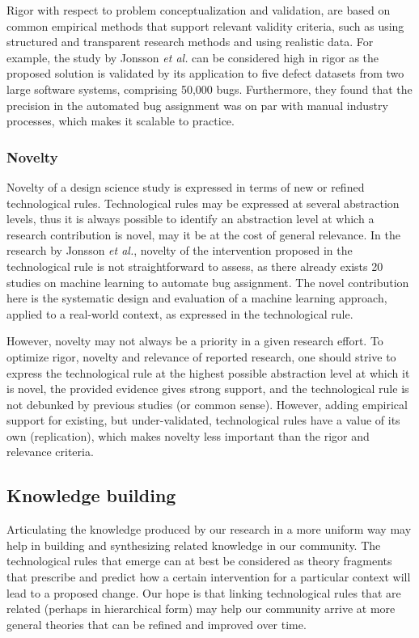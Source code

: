 \documentclass[graybox]{svmult}
\begin{document}
Rigor with respect to problem conceptualization and validation, are based on common empirical methods that support relevant validity criteria, such as using structured and transparent research methods and using realistic data. For example, the study by Jonsson \emph{et al.} can be considered high in rigor as the proposed solution is validated by its application to five defect datasets from two large software systems, comprising 50,000 bugs. Furthermore, they found that the precision in the automated bug assignment was on par with manual industry processes, which makes it scalable to practice.

\subsubsection{Novelty} 
Novelty of a design science study is expressed in terms of new or refined technological rules. Technological rules may be expressed at several abstraction levels, thus it is always possible to identify an abstraction level at which a research contribution is novel, may it be at the cost of general relevance. In the research by Jonsson \emph{et al.}, novelty of the intervention proposed in the technological rule is not straightforward to assess, as there already exists 20 studies on machine learning to automate bug assignment. The novel contribution here is the systematic design and evaluation of a machine learning approach, applied to a real-world context, as expressed in the technological rule.

However, novelty may not always be a priority in a given research effort.
To optimize rigor, novelty and relevance of reported research, one should strive to express the technological rule at the highest possible abstraction level at which it is novel, the provided evidence gives strong support, and the technological rule is not debunked by previous studies (or common sense). However, adding empirical support for existing, but under-validated, technological rules have a value of its own (replication), which makes novelty less important than the rigor and relevance criteria.


\subsection{Knowledge building}
\label{sec:knowledge}

Articulating the knowledge produced by our research in a more uniform way may help in building and synthesizing related knowledge in our community. 
The technological rules that emerge can at best be considered as theory fragments that prescribe and predict how a certain intervention for a particular context will lead to a proposed change. 
Our hope is that linking technological rules that are related (perhaps in hierarchical form) may help our community arrive at more general theories that can be refined and improved over time.
\end{document}
